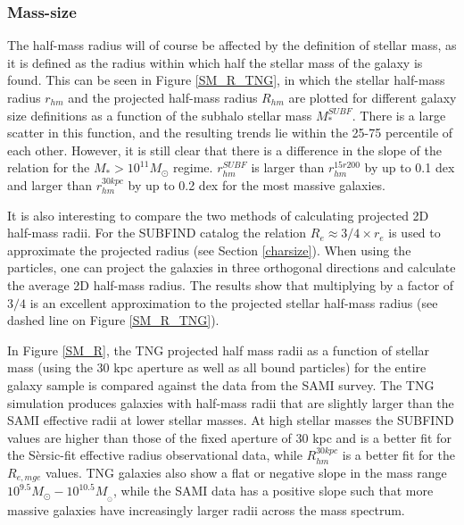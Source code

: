 \subsubsection{Mass-size}
The half-mass radius will of course be affected by the definition of stellar mass, as it is defined as the radius within which half the stellar mass of the galaxy is found. This can be seen in Figure \ref{SM_R_TNG}, in which the stellar half-mass radius $r_{hm}$ and the projected half-mass radius $R_{hm}$ are plotted for different galaxy size definitions as a function of the subhalo stellar mass $M^{SUBF}_\ast$. There is a large scatter in this function, and the resulting trends lie within the 25-75 percentile of each other. However, it is still clear that there is a difference in the slope of the relation for the $M_\ast > 10^{11} M_{\odot}$ regime. $r^{SUBF}_{hm}$ is larger than $r^{15r200}_{hm}$ by up to 0.1 dex and larger than $r^{30kpc}_{hm}$ by up to 0.2 dex for the most massive galaxies. %

It is also interesting to compare the two methods of calculating projected 2D half-mass radii. For the SUBFIND catalog the relation $R_{e} \approx 3/4 \times r_{e}$ is used to approximate the projected radius (see Section \ref{charsize}). When using the particles, one can project the galaxies in three orthogonal directions and calculate the average 2D half-mass radius. The results show that multiplying by a factor of $3/4$ is an excellent approximation to the projected stellar half-mass radius (see dashed line on Figure \ref{SM_R_TNG}).

In Figure \ref{SM_R}, the TNG projected half mass radii as a function of stellar mass (using the 30 kpc aperture as well as all bound particles) for the entire galaxy sample is compared against the data from the SAMI survey. The TNG simulation produces galaxies with half-mass radii that are slightly larger than the SAMI effective radii at lower stellar masses. At high stellar masses the SUBFIND values are higher than those of the fixed aperture of 30 kpc and is a better fit for the Sèrsic-fit effective radius observational data, while $R_{hm}^{30kpc}$ is a better fit for the $R_{e, mge}$ values. TNG galaxies also show a flat or negative slope in the mass range $10^{9.5} M_{\odot} - 10^{10.5} M_{_\odot}$, while the SAMI data has a positive slope such that more massive galaxies have increasingly larger radii across the mass spectrum.


